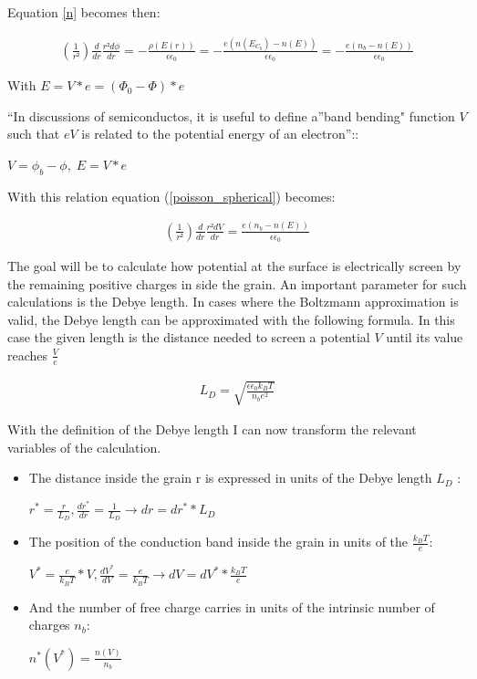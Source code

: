 \documentclass[11pt]{article}
\begin{document}
Equation \ref{n} becomes then:

\begin{align}
\left(\frac{1}{r²}\right)\frac{d}{dr}\frac{r²d\phi}{dr}=-\frac{\rho\left(E\left(r\right)\right)}{\epsilon\epsilon_{0}}=-\frac{e\left(n\left(E_{C_{b}}\right)-n\left(E\right)\right)}{\epsilon\epsilon_{0}}=-\frac{e\left(n_{b}-n\left(E\right)\right)}{\epsilon\epsilon_{0}}\label{poisson_spherical}\tag{Poisson spherical}
\end{align}

With \(E=V*e=(\Phi_{0}-\Phi)*e\)

``In discussions of semiconductos, it is useful to define a''band
bending" function \(V\) such that \(eV\) is related to the potential
energy of an electron''\cite{S.RoyMorrison1977}::

\(V=\phi_{b}-\phi,\;E=V*e\)

With this relation equation (\ref{poisson_spherical}) becomes:

\begin{align}
\left(\frac{1}{r²}\right)\frac{d}{dr}\frac{r²dV}{dr}=\frac{e\left(n_{b}-n\left(E\right)\right)}{\epsilon\epsilon_{0}}\label{poisson_spher_v}\tag{Poisson spherical (V)}
\end{align}

The goal will be to calculate how potential at the surface is
electrically screen by the remaining positive charges in side the grain.
An important parameter for such calculations is the Debye length. In
cases where the Boltzmann approximation is valid, the Debye length can
be approximated with the following formula. In this case the given
length is the distance needed to screen a potential \(V\) until its
value reaches \(\frac{V}{e}\)

\begin{align}
L_{D}=\sqrt{\frac{\epsilon\epsilon_{0}k_{B}T}{n_{b}e^{2}}}
\end{align}

With the definition of the Debye length I can now transform the relevant
variables of the calculation.

\begin{itemize}
\item
  The distance inside the grain r is expressed in units of the Debye
  length \(L_{D}\) :

  \(r^{*}=\frac{r}{L_{D}}, \frac{dr^{*}}{dr}=\frac{1}{L_{D}}\longrightarrow dr=dr^{*}*L_{D}\)
\item
  The position of the conduction band inside the grain in units of the
  \(\frac{k_{B}T}{e}\):

  \(V^{*}=\frac{e}{k_{B}T}*V, \frac{dV^{*}}{dV}=\frac{e}{k_{B}T}\longrightarrow dV=dV^{*}*\frac{k_{B}T}{e}\)
\item
  And the number of free charge carries in units of the intrinsic number
  of charges \(n_b\):

  \(n^{*}(V^{*})=\frac{n(V)}{n_{b}}\)
\end{itemize}
\end{document}
